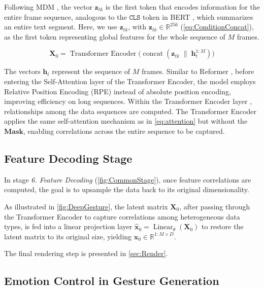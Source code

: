 Following MDM \cite{tevet2022human}, the vector $\mathbf{z}_{tk}$ is the first token that encodes information for the entire frame sequence, analogous to the $\texttt{CLS}$ token in BERT \cite{devlin2019bertpretrainingdeepbidirectional}, which summarizes an entire text segment.
Here, we use $\mathbf{z}_{tk}$, with $\mathbf{z}_{tk} \in \mathbb{R}^{256}$ (\autoref{eq:ConditionConcat}), as the first token representing global features for the whole sequence of $M$ frames.

\begin{equation}
	\mathbf{X}_{0} = \operatorname{Transformer\ Encoder}\bigl(\operatorname{concat}(\mathbf{z}_{tk} \;\|\; \mathbf{h}^{1:M}_{t})\bigr)
	\label{eq:TransformerEncoder}
\end{equation}

The vectors $\mathbf{h}_t$ represent the sequence of $M$ frames. Similar to Reformer \cite{kitaev2020reformer}, before entering the Self-Attention layer of the Transformer Encoder, the model employs Relative Position Encoding (RPE) instead of absolute position encoding, improving efficiency on long sequences.
Within the Transformer Encoder layer \cite{vaswani2017attention}, relationships among the data sequences are computed.
The Transformer Encoder applies the same self-attention mechanism as in \autoref{eq:attention} but without the $\mathbf{Mask}$, enabling correlations across the entire sequence to be captured.





\subsection{Feature Decoding Stage}

In stage \textit{6. Feature Decoding} (\autoref{fig:CommonStage}), once feature correlations are computed, the goal is to upsample the data back to its original dimensionality.

As illustrated in \autoref{fig:DeepGesture}, the latent matrix $\mathbf{X}_{0}$, after passing through the Transformer Encoder to capture correlations among heterogeneous data types, is fed into a linear projection layer
$\hat{\mathbf{x}}_{0} = \operatorname{Linear}_{\theta}(\mathbf{X}_{0})$
to restore the latent matrix to its original size, yielding $\hat{\mathbf{x}}_{0} \in \mathbb{R}^{1:M \times D}$.

The final rendering step is presented in \autoref{sec:Render}.

\subsection{Emotion Control in Gesture Generation}


